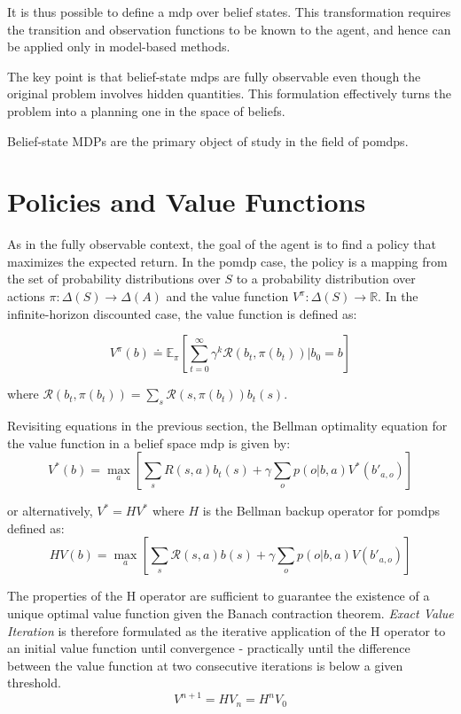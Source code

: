 It is thus possible to define a \gls{mdp} over belief states. 
This transformation requires the transition and observation functions to be known
to the agent, and hence can be applied only in model-based methods.

The key point is that belief-state \glspl{mdp} are fully
observable even though the original problem involves hidden quantities. This
formulation effectively turns the problem into a planning one in the space of beliefs.

Belief-state MDPs are the primary object of study in the field of \glspl{pomdp}.

\section{Policies and Value Functions}
As in the fully observable context, the goal of the agent is to find a policy that maximizes the expected 
return. In the \gls{pomdp} case, the policy is a mapping from the set of probability distributions 
over $S$ to a probability distribution over actions $\pi : \Delta(S) \rightarrow \Delta(A)$ 
and the value function $V^{\pi} : \Delta(S) \rightarrow \mathbb{R}$. 
In the infinite-horizon discounted case, the value function is defined as:

$$V^{\pi}(b) \doteq \mathbb{E}_{\pi}\left[ \sum ^\infty _{t=0} \gamma^k \mathcal{R}(b_t,\pi(b_t)) | b_0 = b  \right]$$

where $\mathcal{R}(b_t,\pi(b_t)) = \sum_s \mathcal{R}(s,\pi(b_t))b_t(s)$.


Revisiting equations in the previous section, the Bellman optimality equation for the value function 
in a belief space \gls{mdp} is given by:
$$V^* (b) = \max_a \left[\sum_s R(s,a)b_t(s) + \gamma\sum_o p(o|b,a) V^*(b'_{a,o}) \right]$$

or alternatively, $V^* = HV^*$ where $H$ is the Bellman backup operator for \gls{pomdp}s defined as:
$$H V(b) = \max_a \left[\sum_s \mathcal{R}(s,a)b(s) + \gamma\sum_o p(o|b,a) V(b'_{a,o}) \right]$$

The properties of the H operator are sufficient to guarantee the existence of a unique optimal value 
function given the Banach contraction theorem. \textit{Exact Value Iteration} is therefore formulated 
as the iterative application of the H operator to an initial value function until convergence - practically 
until the difference between the value function at two consecutive iterations is below a given threshold.
$$V^{n+1} = HV_n = H^n V_0$$ 


